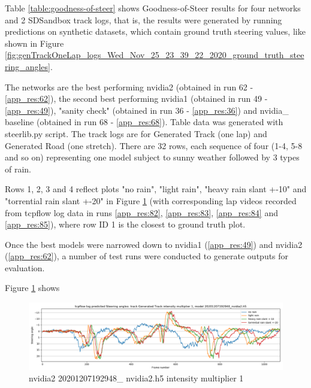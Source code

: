 Table \ref{table:goodness-of-steer} shows Goodness-of-Steer results for four networks and 2 SDSandbox track logs, that is, the results were generated by running predictions on synthetic datasets, which contain ground truth steering values, like shown in Figure \ref{fig:genTrackOneLap_logs_Wed_Nov_25_23_39_22_2020_ground_truth_steering_angles}. 

The networks are the best performing nvidia2 (obtained in run 62 - \ref{app_res:62}), the second best performing nvidia1 (obtained in run 49 - \ref{app_res:49}), "sanity check" (obtained in run 36 - \ref{app_res:36}) and nvidia\_ baseline (obtained in run 68 - \ref{app_res:68}). Table data was generated with steerlib.py script. The track logs are for Generated Track (one lap) and Generated Road (one stretch). There are 32 rows, each sequence of four (1-4, 5-8 and so on) representing one model subject to sunny weather followed by 3 types of rain. 

Rows 1, 2, 3 and 4 reflect plots "no rain", "light rain", "heavy rain slant +-10" and "torrential rain slant +-20" in Figure \ref{fig:sa_GeneratedTrackintensitymultiplier1_20201207192948_nvidia2} (with corresponding lap videos recorded from tcpflow log data in runs \ref{app_res:82}, \ref{app_res:83}, \ref{app_res:84} and  \ref{app_res:85}), where row ID 1 is the closest to ground truth plot. 




Once the best models were narrowed down to nvidia1 (\ref{app_res:49}) and nvidia2 (\ref{app_res:62}), a number of test runs were conducted to generate outputs for evaluation. 



    






Figure \ref{fig:sa_GeneratedTrackintensitymultiplier1_20201207192948_nvidia2} shows
\begin{figure}[h!]
 \centering 
 \includegraphics[width=\textwidth]{Figures/sa_GeneratedTrackintensitymultiplier1_20201207192948_nvidia2.h5}
 \caption{nvidia2 20201207192948\_ nvidia2.h5 intensity multiplier 1}
 \label{fig:sa_GeneratedTrackintensitymultiplier1_20201207192948_nvidia2} 
\end{figure}

